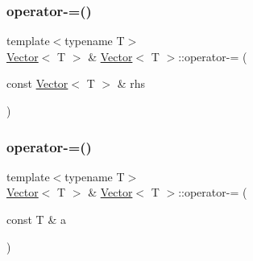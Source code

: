 \mbox{\label{classVector_ab5ed11e19503bbc0ee10c7a8d1ee2978_ab5ed11e19503bbc0ee10c7a8d1ee2978}} 
\subsubsection{\texorpdfstring{operator-\/=()}{operator-=()}\hspace{0.1cm}{\footnotesize\ttfamily [1/2]}}
{\footnotesize\ttfamily template$<$typename T$>$ \\
\mbox{\hyperlink{classVector}{Vector}}$<$ T $>$ \& \mbox{\hyperlink{classVector}{Vector}}$<$ T $>$\+::operator-\/= (\begin{DoxyParamCaption}\item[{const \mbox{\hyperlink{classVector}{Vector}}$<$ T $>$ \&}]{rhs }\end{DoxyParamCaption})\hspace{0.3cm}{\ttfamily [inline]}}

\mbox{\label{classVector_a7581aba7a67b45ff1b2848d37e00cfa1_a7581aba7a67b45ff1b2848d37e00cfa1}} 
\subsubsection{\texorpdfstring{operator-\/=()}{operator-=()}\hspace{0.1cm}{\footnotesize\ttfamily [2/2]}}
{\footnotesize\ttfamily template$<$typename T$>$ \\
\mbox{\hyperlink{classVector}{Vector}}$<$ T $>$ \& \mbox{\hyperlink{classVector}{Vector}}$<$ T $>$\+::operator-\/= (\begin{DoxyParamCaption}\item[{const T \&}]{a }\end{DoxyParamCaption})\hspace{0.3cm}{\ttfamily [inline]}}

\mbox{\label{classVector_adbf519ce5d68eb131947137e30596dc1_adbf519ce5d68eb131947137e30596dc1}} 
